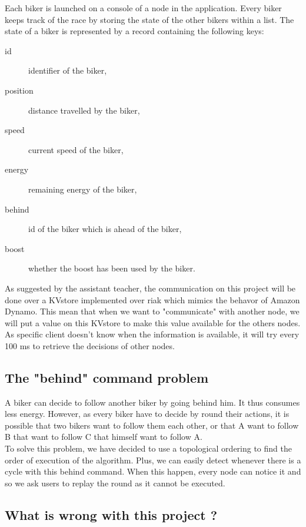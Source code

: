 \documentclass[a4paper, 11pt]{article}
\begin{document}
Each biker is launched on a console of a node in the application.
Every biker keeps track of the race by storing the state of the other bikers within a list.
The state of a biker is represented by a record containing the following keys:
\begin{description}
	\item[id] identifier of the biker,
	\item[position] distance travelled by the biker,
	\item[speed] current speed of the biker,
	\item[energy] remaining energy of the biker,
	\item[behind] id of the biker which is ahead of the biker,
	\item[boost] whether the boost has been used by the biker.
\end{description}

As suggested by the assistant teacher, the communication on this project will be done over a KVstore implemented over riak which mimics the behavor of Amazon Dynamo. This mean that when we want to "communicate" with another node, we will put a value on this KVstore to make this value available for the others nodes. As specific client doesn't know when the information is available, it will try every 100 ms to retrieve the decisions of other nodes. 

\subsection{The "behind" command problem}

A biker can decide to follow another biker by going behind him. It thus consumes less energy. However, as every biker have to decide by round their actions, it is possible that two bikers want to follow them each other, or that A want to follow B that want to follow C that himself want to follow A. \\

To solve this problem, we have decided to use a topological ordering to find the order of execution of the algorithm. Plus, we can easily detect whenever there is a cycle with this behind command. When this happen, every node can notice it and so we ask users to replay the round as it cannot be executed. \\

\subsection{What is wrong with this project ?}
\end{document}
